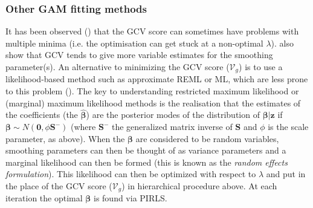 \subsubsection{Other GAM fitting methods}
\label{intro-otherGAMfit}

It has been observed (\cite{reissogden}) that the GCV score can sometimes have problems with multiple minima (i.e. the optimisation can get stuck at a non-optimal $\lambda$).  also show that GCV tends to give more variable estimates for the smoothing parameter(s). An alternative to minimizing the GCV score ($\mathcal{V}_g$) is to use a likelihood-based method such as approximate REML or ML, which are less prone to this problem (\cite{remlpaper}). The key to understanding restricted maximum likelihood or (marginal) maximum likelihood methods is the realisation that the estimates of the coefficients (the $\bm{\hat{\beta}}$) are the posterior modes of the distribution of $\bm{\beta}|\mathbf{z}$ if $\bm{\beta} \sim N(\mathbf{0}, \phi \mathbf{S}^-)$ (where $\mathbf{S}^-$ the generalized matrix inverse of $\mathbf{S}$ and $\phi$ is the scale parameter, as above). When the $\bm{\beta}$ are considered to be random variables, smoothing parameters can then be thought of as variance parameters and a marginal likelihood can then be formed (this is known as the \textit{random effects formulation}).  This likelihood can then be optimized with respect to $\lambda$ and put in the place of the GCV score ($\mathcal{V}_g$) in hierarchical procedure above. At each iteration the optimal $\bm{\beta}$ is found via PIRLS.


